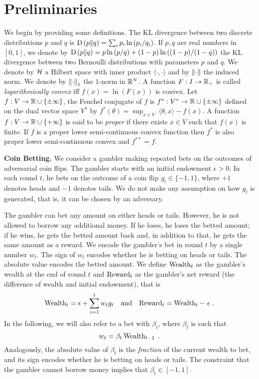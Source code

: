 \section{Preliminaries}
\label{section:preliminaries}

We begin by providing some definitions.  The \ac{KL} divergence between two
discrete distributions $p$ and $q$ is $\operatorname{D}\left({p}\middle\|{q}\right) = \sum_{i} p_i \ln\left(
p_i/q_i \right)$. If $p,q$ are real numbers in $[0,1]$, we denote by $\operatorname{D}\left({p}\middle\|{q}\right)
= p \ln \left(p/q \right) + (1-p) \ln \left((1-p)/(1-q) \right)$ the \ac{KL}
divergence between two Bernoulli distributions with parameters $p$ and $q$.  We
denote by $\mathcal{H}$ a Hilbert space with inner product $\langle \cdot, \cdot\rangle$
and by $\left\|{\cdot}\right\|$ the induced norm.  We denote by $\left\|{\cdot}\right\|_1$ the
$1$-norm in $\mathbb{R}^N$.  A function $F:I \to \mathbb{R}_+$ is called \emph{logarithmically
convex} iff $f(x) = \ln(F(x))$ is convex.  Let $f:V \to \mathbb{R} \cup \{\pm\infty\}$,
the Fenchel conjugate of $f$ is $f^*:V^* \to \mathbb{R} \cup \{\pm \infty\}$ defined on
the dual vector space $V^*$ by $f^*(\theta) = \sup_{x \in V} \ \langle \theta,
x \rangle - f(x)$.  A function $f:V \to \mathbb{R} \cup \{+\infty\}$ is said to be
\emph{proper} if there exists $x \in V$ such that $f(x)$ is finite.  If $f$ is
a proper lower semi-continuous convex function then $f^*$ is also proper lower
semi-continuous convex and $f^{**}=f$.

\textbf{Coin Betting.} We consider a gambler making repeated bets on the
outcomes of adversarial coin flips. The gambler starts with an initial
endowment $\epsilon > 0$. In each round $t$, he bets on the outcome of a coin
flip $g_t \in \{-1,1\}$, where $+1$ denotes heads and $-1$ denotes tails.  We
do not make any assumption on how $g_t$ is generated, that is, it can be chosen
by an adversary.

The gambler can bet any amount on either heads or tails. However, he is not
allowed to borrow any additional money. If he loses, he loses the betted
amount; if he wins, he gets the betted amount back and, in addition to that, he
gets the same amount as a reward.  We encode the gambler's bet in round $t$ by
a single number $w_t$. The sign of $w_t$ encodes whether he is betting on heads
or tails. The absolute value encodes the betted amount.  We define $\operatorname{Wealth}_t$
as the gambler's wealth at the end of round $t$ and $\operatorname{Reward}_t$ as the
gambler's net reward (the difference of wealth and initial endowment), that is
\begin{align}
\label{equation:def_wealth_reward}
\operatorname{Wealth}_t=\epsilon+\sum_{i=1}^t w_t g_t &
& \text{and} &
& \operatorname{Reward}_t = \operatorname{Wealth}_t - \ \epsilon \; .
\end{align}
In the following, we will also refer to a bet with $\beta_t$, where $\beta_t$
is such that
\begin{equation}
\label{equation:def_wt}
w_t = \beta_t \operatorname{Wealth}_{t-1} \; .
\end{equation}
Analogously, the absolute value of $\beta_t$ is the \emph{fraction} of the
current wealth to bet, and its sign encodes whether he is betting on heads or
tails. The constraint that the gambler cannot borrow money implies that
$\beta_t \in [-1,1]$.


